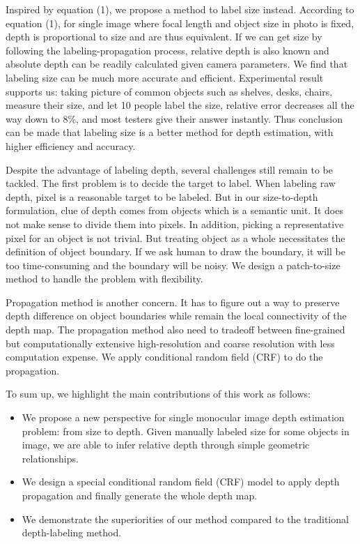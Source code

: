 \documentclass[10pt,twocolumn,letterpaper]{article}
\begin{document}
Inspired by equation (1), we propose a method to label size instead. According to equation (1), for single image where focal length and object size in photo is fixed, depth is proportional to size and are thus equivalent. If we can get size by following the labeling-propagation process, relative depth is also known and absolute depth can be readily calculated given camera parameters. We find that labeling size can be much more accurate and efficient. Experimental result supports us: taking picture of common objects such as shelves, desks, chairs, measure their size, and let 10 people label the size, relative error decreases all the way down to 8\%, and most testers give their answer instantly. Thus conclusion can be made that labeling size is a better method for depth estimation, with higher efficiency and accuracy. 

Despite the advantage of labeling depth, several challenges still remain to be tackled. The first problem is to decide the target to label. When labeling raw depth, pixel is a reasonable target to be labeled. But in our size-to-depth formulation, clue of depth comes from objects which is a semantic unit. It does not make sense to divide them into pixels. In addition, picking a representative pixel for an object is not trivial. But treating object as a whole necessitates the definition of object boundary. If we ask human to draw the boundary, it will be too time-consuming and the boundary will be noisy. We design a patch-to-size method to handle the problem with flexibility.

Propagation method is another concern. It has to figure out a way to preserve depth difference on object boundaries while remain the local connectivity of the depth map. The propagation method also need to tradeoff between fine-grained but computationally extensive high-resolution and coarse resolution with less computation expense. We apply conditional random field (CRF) to do the propagation.

To sum up, we highlight the main contributions of this work as follows:
\begin{itemize}
\item We propose a new perspective for single monocular image depth estimation problem: from size to depth. Given manually labeled size for some objects in image, we are able to infer relative depth through simple geometric relationships. 
\item We design a special conditional random field (CRF) model to apply depth propagation and finally generate the whole depth map.
\item We demonstrate the superiorities of our method compared to the traditional depth-labeling method.
\end{itemize}
\end{document}
